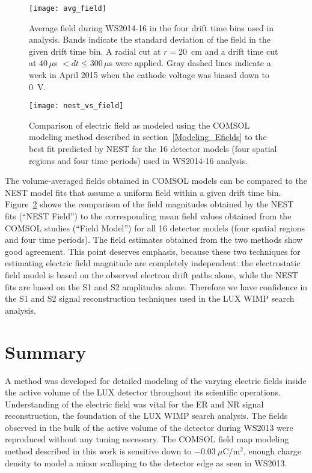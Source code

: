 \documentclass[11pt,a4paper]{article}
\begin{document}
\begin{figure}[ht!]
\begin{center}
\texttt{[image: avg\_field]}
\caption{Average field during WS2014-16 in the four drift time bins used in analysis. Bands indicate the standard deviation of the field in the given drift time bin. A radial cut at $r=20$~cm and a drift time cut at $40\,\mu$s $ < dt \leq 300\,\mu$s were applied. Gray dashed lines indicate a week in April 2015 when the cathode voltage was biased down to 0~V.}
\label{fig:avg_field}
\end{center} 
\end{figure}

\begin{figure}[ht!]
\begin{center}
\texttt{[image: nest\_vs\_field]}
\caption{Comparison of electric field as modeled using the COMSOL modeling method described in section~\ref{Modeling_Efields} to the best fit predicted by NEST for the 16 detector models (four spatial regions and four time periods) used in WS2014-16 analysis.}
\label{fig:nest_vs_field}
\end{center} 
\end{figure}

The volume-averaged fields obtained in \textsc{COMSOL} models can be compared to the NEST model fits that assume a uniform field within a given drift time bin. Figure~\ref{fig:nest_vs_field} shows the comparison of the field magnitudes obtained by the NEST fits (``NEST Field'') to the corresponding mean field values obtained from the \textsc{COMSOL} studies (``Field Model'') for all 16 detector models (four spatial regions and four time periods). The field estimates obtained from the two methods show good agreement. This point deserves emphasis, because these two techniques for estimating electric field magnitude are completely independent: the electrostatic field model is based on the observed electron drift paths alone, while the NEST fits are based on the S1 and S2 amplitudes alone. Therefore we have confidence in the S1 and S2 signal reconstruction techniques used in the LUX WIMP search analysis.

\section{Summary}
A method was developed for detailed modeling of the varying electric fields inside the active volume of the LUX detector throughout its scientific operations. Understanding of the electric field was vital for the ER and NR signal reconstruction, the foundation of the LUX WIMP search analysis. The fields observed in the bulk of the active volume of the detector during WS2013 were reproduced without any tuning necessary. The \textsc{COMSOL} field map modeling method described in this work is sensitive down to $-0.03~\mu$C/m$^2$, enough charge density to model a minor scalloping to the detector edge as seen in WS2013.
\end{document}
